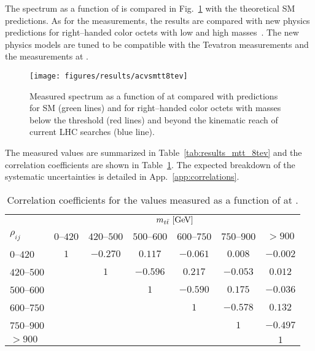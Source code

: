 The \ac{} spectrum as a function of \mtt{} is compared in
Fig.~\ref{fig:8tevacvsmtt} with the theoretical SM predictions.
As for the \seventev{} measurements, the results are compared with new
physics predictions for right--handed color octets with low and high
masses~\cite{Aguilar-Saavedra:2014nja}. The new physics models are
tuned to be compatible with the Tevatron \afb{} measurements and the
\ac{} measurements at \seventev{}.
\begin{figure}[!htb]\centering
  \texttt{[image: figures/results/acvsmtt8tev]}
  \caption{Measured \ac{} spectrum as a function of \mtt{} at
    \eighttev{} compared with predictions for SM (green lines) and for right--handed
    color octets with masses below the \ttbar{} threshold (red lines) and beyond
    the kinematic reach of current LHC searches (blue line).}
  \label{fig:8tevacvsmtt}
\end{figure}
The measured \ac{} values are summarized in
Table~\ref{tab:results_mtt_8tev} and the correlation coefficients are
shown in Table~\ref{tab:corr_mtt8tev}. The expected breakdown of the
systematic uncertainties is detailed in App.~\ref{app:correlations}.

%
\begin{table}[!htp]\centering
\begin{tabular}{l c c c c c c}
  \toprule
  &\multicolumn{6}{c}{$m_{t\bar{t}}{}~[\rm{GeV}]$}    \\
  $\rho_{ij}$ & $0$--$420$ & $420$--$500$ & $500$--$600$ &
  $600$--$750$ & $750$--$900$ & $>900$ \\
  \midrule
  $0$--$420$      & $1$ & $-0.270$ & $0.117$ & $-0.061$ & $0.008$ & $-0.002$ \\
  $420$--$500$    &     & $1$           & $-0.596$ & $0.217$ &
  $-0.053$ & $0.012$ \\
  $500$--$600$    &     &                   & $1$          & $-0.590$
  & $0.175$ & $-0.036$ \\
  $600$--$750$    &     &         &         & $1$     & $-0.578$ & $0.132$ \\
  $750$--$900$    &     &         &         &            & $1$ & $-0.497$ \\
  $>900$               &     &         &         &         &   &$1$     \\
  \bottomrule
\end{tabular}
\caption{Correlation coefficients for the \ac{} values measured as a
  function of \mtt{} at \eighttev{}.}
\label{tab:corr_mtt8tev}
\end{table}


